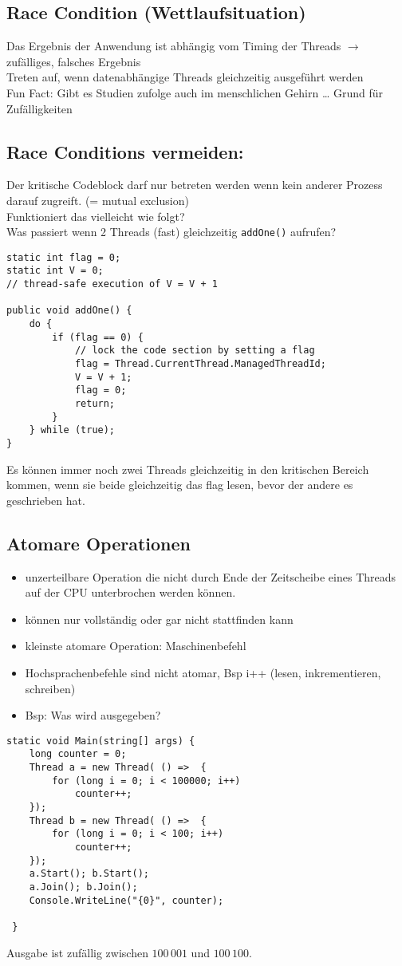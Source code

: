 \subsection{Race Condition (Wettlaufsituation)}
Das Ergebnis der Anwendung ist abhängig vom Timing der Threads $\to$ zufälliges, falsches Ergebnis\\
Treten auf, wenn datenabhängige Threads gleichzeitig ausgeführt werden\\
Fun Fact: Gibt es Studien zufolge auch im menschlichen Gehirn … Grund für Zufälligkeiten 

\subsection{Race Conditions vermeiden:} Der kritische Codeblock darf nur betreten werden wenn kein anderer Prozess darauf zugreift. (= mutual exclusion)\bigskip\\
Funktioniert das vielleicht wie folgt?\\
Was passiert wenn 2 Threads (fast) gleichzeitig \lstinline$addOne()$ aufrufen? 

\begin{lstlisting}[language={[Sharp]C}]
static int flag = 0; 
static int V = 0; 
// thread-safe execution of V = V + 1

public void addOne() { 
	do { 
		if (flag == 0) { 
			// lock the code section by setting a flag 
			flag = Thread.CurrentThread.ManagedThreadId;
			V = V + 1; 
			flag = 0; 
			return;  
		} 
	} while (true); 
}
\end{lstlisting}
Es können immer noch zwei Threads gleichzeitig in den kritischen Bereich kommen, wenn sie beide gleichzeitig das flag lesen, bevor der andere es geschrieben hat.

\subsection{Atomare Operationen}

\begin{itemize}
\item unzerteilbare Operation die nicht durch Ende der Zeitscheibe eines Threads auf der CPU unterbrochen werden können. 
\item können nur vollständig oder gar nicht stattfinden kann
\item kleinste atomare Operation: Maschinenbefehl
\item Hochsprachenbefehle sind nicht atomar, Bsp i++ (lesen, inkrementieren, schreiben)
\item Bsp: Was wird ausgegeben? 
\end{itemize}
\begin{lstlisting}[language={[Sharp]C}]
static void Main(string[] args) {
	long counter = 0;
	Thread a = new Thread( () =>  {
		for (long i = 0; i < 100000; i++) 
			counter++;
	});
	Thread b = new Thread( () =>  {
		for (long i = 0; i < 100; i++) 
			counter++;
	});
	a.Start(); b.Start();
	a.Join(); b.Join();
	Console.WriteLine("{0}", counter);

 }
\end{lstlisting}
Ausgabe ist zufällig zwischen $100\,001$ und $100\,100$.

